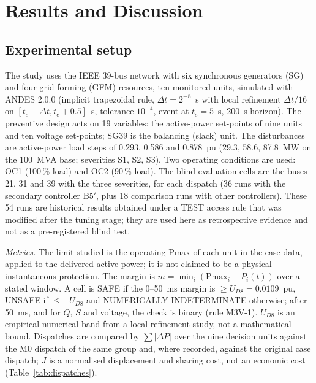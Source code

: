 \providecommand{\todo}[1]{\textbf{[PENDING: #1]}}

\section{Results and Discussion}
\label{sec:results}

\subsection{Experimental setup}
\label{sec:setup}
The study uses the IEEE 39-bus network with six synchronous generators (SG) and four grid-forming (GFM) resources, ten monitored units, simulated with ANDES 2.0.0 (implicit trapezoidal rule, $\Delta t=2^{-8}$~s with local refinement $\Delta t/16$ on $[t_e-\Delta t,t_e+0.5]$~s, tolerance $10^{-4}$, event at $t_e=5$~s, 200~s horizon). The preventive design acts on 19 variables: the active-power set-points of nine units and ten voltage set-points; SG39 is the balancing (slack) unit. The disturbances are active-power load steps of 0.293, 0.586 and 0.878~pu (29.3, 58.6, 87.8~MW on the 100~MVA base; severities S1, S2, S3). Two operating conditions are used: OC1 (100\,\% load) and OC2 (90\,\% load). The blind evaluation cells are the buses 21, 31 and 39 with the three severities, for each dispatch (36 runs with the secondary controller B5$'$, plus 18 comparison runs with other controllers). These 54 runs are historical results obtained under a TEST access rule that was modified after the tuning stage; they are used here as retrospective evidence and not as a pre-registered blind test.

\emph{Metrics.} The limit studied is the operating Pmax of each unit in the case data, applied to the delivered active power; it is not claimed to be a physical instantaneous protection. The margin is $m=\min_i(\mathrm{Pmax}_i-P_i(t))$ over a stated window. A cell is SAFE if the 0--50~ms margin is $\ge U_{D8}=0.0109$~pu, UNSAFE if $\le-U_{D8}$ and NUMERICALLY INDETERMINATE otherwise; after 50~ms, and for $Q$, $S$ and voltage, the check is binary (rule M3V-1). $U_{D8}$ is an empirical numerical band from a local refinement study, not a mathematical bound. Dispatches are compared by $\sum|\Delta P|$ over the nine decision units against the M0 dispatch of the same group and, where recorded, against the original case dispatch; $J$ is a normalised displacement and sharing cost, not an economic cost (Table~\ref{tab:dispatches}).

